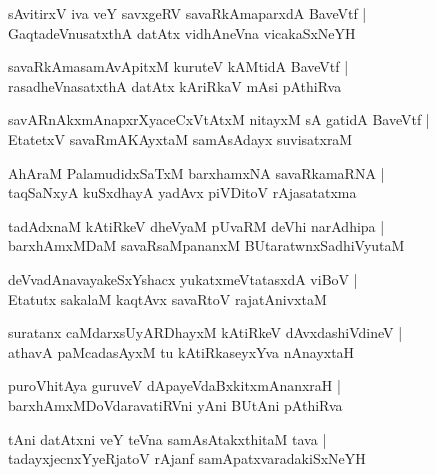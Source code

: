 \begin{shloka}
sAvitirxV iva veY savxgeRV savaRkAmaparxdA BaveVtf |\\
GaqtadeVnusatxthA datAtx vidhAneVna vicakaSxNeYH 
\end{shloka}

\begin{shloka}
savaRkAmasamAvApitxM kuruteV kAMtidA BaveVtf |\\
rasadheVnasatxthA datAtx kAriRkaV mAsi pAthiRva
\end{shloka}

\begin{shloka}
savARnAkxmAnapxrXyaceCxVtAtxM nitayxM sA gatidA BaveVtf |\\
EtatetxV savaRmAKAyxtaM samAsAdayx suvisatxraM 
\end{shloka}

\begin{shloka}
AhAraM PalamudidxSaTxM barxhamxNA savaRkamaRNA |\\
taqSaNxyA kuSxdhayA yadAvx piVDitoV rAjasatatxma 
\end{shloka}

\begin{shloka}
tadAdxnaM kAtiRkeV dheVyaM pUvaRM deVhi narAdhipa |\\
barxhAmxMDaM savaRsaMpananxM BUtaratwnxSadhiVyutaM 
\end{shloka}

\begin{shloka}
deVvadAnavayakeSxYshacx yukatxmeVtatasxdA viBoV |\\
Etatutx sakalaM kaqtAvx savaRtoV rajatAnivxtaM 
\end{shloka}

\begin{shloka}
suratanx caMdarxsUyARDhayxM kAtiRkeV dAvxdashiVdineV |\\
athavA paMcadasAyxM tu kAtiRkaseyxYva nAnayxtaH 
\end{shloka}

\begin{shloka}
puroVhitAya guruveV dApayeVdaBxkitxmAnanxraH |\\
barxhAmxMDoVdaravatiRVni yAni BUtAni pAthiRva 
\end{shloka}

\begin{shloka}
tAni datAtxni veY teVna samAsAtakxthitaM tava |\\
tadayxjecnxYyeRjatoV rAjanf samApatxvaradakiSxNeYH
\end{shloka}

